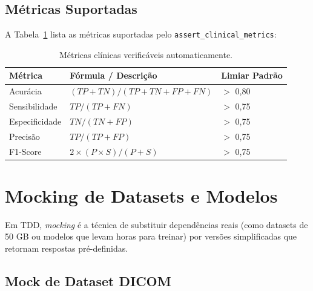 \subsection{Métricas Suportadas}

A Tabela~\ref{tab:clinical-metrics-supported} lista as métricas suportadas
pelo \texttt{assert\_clinical\_metrics}:

\begin{table}[H]
  \centering
  \caption{Métricas clínicas verificáveis automaticamente.}
  \label{tab:clinical-metrics-supported}
  \begin{tabularx}{\textwidth}{lXl}
    \toprule
    \textbf{Métrica} & \textbf{Fórmula / Descrição} & \textbf{Limiar Padrão} \\
    \midrule
    Acurácia & $(TP + TN) / (TP + TN + FP + FN)$ & $>$ 0,80 \\
    Sensibilidade & $TP / (TP + FN)$ & $>$ 0,75 \\
    Especificidade & $TN / (TN + FP)$ & $>$ 0,75 \\
    Precisão & $TP / (TP + FP)$ & $>$ 0,75 \\
    F1-Score & $2 \times (P \times S) / (P + S)$ & $>$ 0,75 \\
    \bottomrule
  \end{tabularx}
\end{table}


\section{Mocking de Datasets e Modelos}

Em TDD, \textit{mocking} é a técnica de substituir dependências reais
(como datasets de 50 GB ou modelos que levam horas para treinar) por
versões simplificadas que retornam respostas pré-definidas.

\subsection{Mock de Dataset DICOM}

